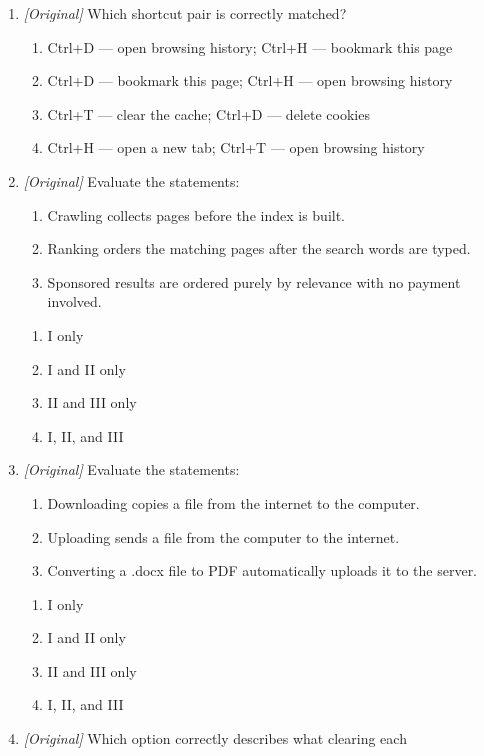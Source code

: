 \documentclass[11pt]{article}
\begin{document}
\begin{enumerate}[label=\textbf{Q\arabic*.}, leftmargin=*]
\item \textit{[Original]} Which shortcut pair is correctly matched?
  \begin{enumerate}[label=\Alph*.]
    \item Ctrl+D --- open browsing history; Ctrl+H --- bookmark this page
    \item Ctrl+D --- bookmark this page; Ctrl+H --- open browsing history
    \item Ctrl+T --- clear the cache; Ctrl+D --- delete cookies
    \item Ctrl+H --- open a new tab; Ctrl+T --- open browsing history
  \end{enumerate}
\item \textit{[Original]} Evaluate the statements:
  \begin{enumerate}[label=\Roman*.]
    \item Crawling collects pages before the index is built.
    \item Ranking orders the matching pages after the search words are typed.
    \item Sponsored results are ordered purely by relevance with no payment involved.
  \end{enumerate}
  \begin{enumerate}[label=\Alph*.]
    \item I only
    \item I and II only
    \item II and III only
    \item I, II, and III
  \end{enumerate}
\item \textit{[Original]} Evaluate the statements:
  \begin{enumerate}[label=\Roman*.]
    \item Downloading copies a file from the internet to the computer.
    \item Uploading sends a file from the computer to the internet.
    \item Converting a .docx file to PDF automatically uploads it to the server.
  \end{enumerate}
  \begin{enumerate}[label=\Alph*.]
    \item I only
    \item I and II only
    \item II and III only
    \item I, II, and III
  \end{enumerate}
\item \textit{[Original]} Which option correctly describes what clearing each

\end{enumerate}
\end{document}
